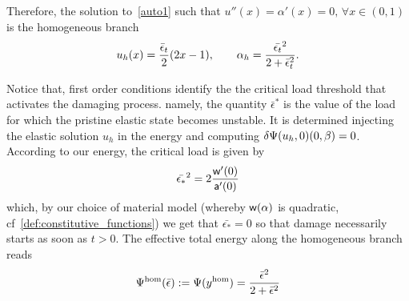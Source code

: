Therefore, the solution to~\eqref{auto1} such that $u''(x)=\alpha'(x)= 0, \, \forall x\in (0, 1)$ is the homogeneous branch
\begin{equation}
u_h(x) =  \frac{\bar \epsilon_t}{2}(2x-1),\qquad\alpha_h = \frac{\Bar{\epsilon_t}^2}{2 + \Bar\epsilon_t^2}\label{eq:homo1}.
\end{equation}

Notice that,  
first order conditions identify the the critical load threshold that activates the damaging process. namely, the quantity $\bar\epsilon^*$ is the value of the load for which the pristine elastic state becomes unstable. It is determined injecting the elastic solution $u_h$ in the energy and computing $\delta \Psi(u_h, 0)(0, \beta)=0$.
According to our energy, the critical load is given by
\begin{equation}
    \bar{\epsilon_*}^2 = 2\frac{\mathsf{w}'(0)}{\mathsf{a}'(0)} 
\end{equation}
% 
which, by our choice of material model (whereby $\mathsf{w}(\alpha)$ is quadratic, cf~\eqref{def:constitutive_functions}) we get that $\bar{\epsilon_*}=0$ so that damage necessarily starts as soon as $t>0$.
The effective {total} energy along the {homogeneous} branch reads  
\begin{equation}
    \label{eq:energy_homogeneous}
    \Psi^\text{hom}(\bar\epsilon) :=\Psi(y^{\text{hom}}) = \frac{\Bar{\epsilon}^2}{2 + \Bar\epsilon^2}
\end{equation}



